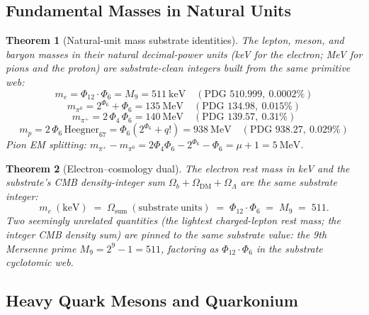 \documentclass[11pt]{article}
\newtheorem{theorem}{Theorem}[section]
\begin{document}
\subsection{Fundamental Masses in Natural Units}

\begin{theorem}[Natural-unit mass substrate identities]\label{thm:nat_mass}
The lepton, meson, and baryon masses in their natural decimal-power
units (keV for the electron; MeV for pions and the proton) are
substrate-clean integers built from the same primitive web:
\[
  m_e   = \Phi_{12}\cdot\Phi_6 = M_9 = 511~\mathrm{keV}
        \quad (\text{PDG } 510.999,\ 0.0002\%)
\]
\[
  m_{\pi^0} = 2^{\Phi_6} + \Phi_6 = 135~\mathrm{MeV}
        \quad (\text{PDG } 134.98,\ 0.015\%)
\]
\[
  m_{\pi^+} = 2\,\Phi_4\,\Phi_6 = 140~\mathrm{MeV}
        \quad (\text{PDG } 139.57,\ 0.31\%)
\]
\[
  m_p = 2\,\Phi_6\,\mathrm{Heegner}_{67} = \Phi_6(2^{\Phi_6}+q!) = 938~\mathrm{MeV}
        \quad (\text{PDG } 938.27,\ 0.029\%)
\]
Pion EM splitting:
$m_{\pi^+} - m_{\pi^0} = 2\Phi_4\Phi_6 - 2^{\Phi_6} - \Phi_6 = \mu+1 = 5~\mathrm{MeV}$.
\end{theorem}

\begin{theorem}[Electron--cosmology dual]\label{thm:e_cosmo_dual}
The electron rest mass in keV and the substrate's CMB density-integer
sum $\Omega_b + \Omega_{\mathrm{DM}} + \Omega_\Lambda$ are
\emph{the same substrate integer}:
\[
  m_e~\mathrm{(keV)} \;=\; \Omega_{\mathrm{sum}}~\mathrm{(substrate~units)}
                       \;=\; \Phi_{12}\cdot\Phi_6 \;=\; M_9 \;=\; 511.
\]
Two seemingly unrelated quantities (the lightest charged-lepton rest
mass; the integer CMB density sum) are pinned to the same
substrate value: the 9th Mersenne prime $M_9 = 2^9 - 1 = 511$,
factoring as $\Phi_{12}\cdot\Phi_6$ in the substrate cyclotomic web.
\end{theorem}

\subsection{Heavy Quark Mesons and Quarkonium}
\end{document}
